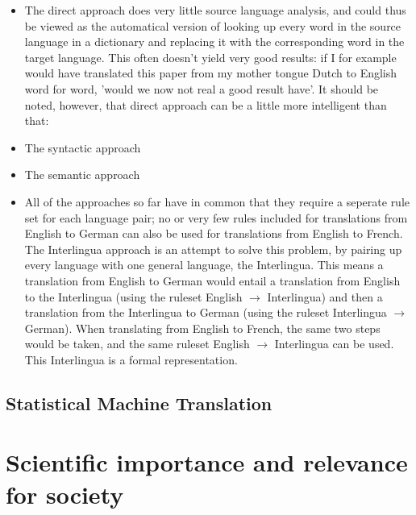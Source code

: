 \documentclass[12pt]{article}
\begin{document}
\begin{itemize}
\item The direct approach does very little source language analysis, and could thus be viewed as the automatical version of looking up every word in the source language in a dictionary and replacing it with the corresponding word in the target language. This often doesn't yield very good results: if I for example would have translated this paper from my mother tongue Dutch to English word for word, 'would we now not real a good result have'. It should be noted, however, that direct approach can be a little more intelligent than that: %
\item The syntactic approach
\item The semantic approach
\item All of the approaches so far have in common that they require a seperate rule set for each language pair; no or very few rules included for translations from English to German can also be used for translations from English to French. The Interlingua approach is an attempt to solve this problem, by pairing up every language with one general language, the Interlingua. This means a translation from English to German would entail a translation from English to the Interlingua (using the ruleset English $\rightarrow$ Interlingua) and then a translation from the Interlingua to German (using the ruleset Interlingua $\rightarrow$ German). When translating from English to French, the same two steps would be taken, and the same ruleset English $\rightarrow$ Interlingua can be used. This Interlingua is a formal representation.
\end{itemize}


\subsection{Statistical Machine Translation}












\section{Scientific importance and relevance for society}

\end{document}
